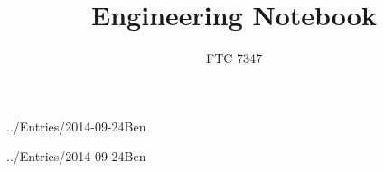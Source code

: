 \documentclass[a4paper,10pt]{article}
\title{Engineering Notebook}
\author{FTC 7347}
\begin{document}
\maketitle









.{./Entries/2014-09-24Ben}





.{./Entries/2014-09-24Ben}
\end{document}

